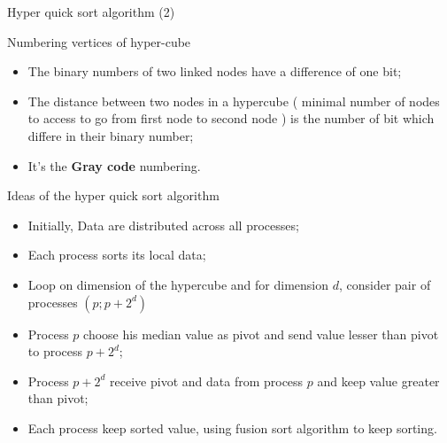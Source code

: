 \documentclass[compress,10pt,aspectratio=169]{beamer}
\begin{document}
\begin{frame}[fragile]{Hyper quick sort algorithm (2)}
\scriptsize

\begin{block}{\small Numbering vertices of hyper-cube}
\begin{itemize}
    \item The binary numbers of two linked nodes have a difference of one bit;
    \item The distance between two nodes in a hypercube ( minimal number of nodes to access to go from
          first node to second node ) is the number of bit which differe in their binary number;
    \item It's the \textbf{Gray code} numbering.
\end{itemize}        
\end{block}

\begin{exampleblock}{\small Ideas of the hyper quick sort algorithm}
    \begin{itemize}
        \item Initially, Data are distributed across all processes;
        \item Each process sorts its local data;
        \item Loop on dimension of the hypercube and for dimension $d$, consider pair of processes $\left(p;p+2^{d}\right)$
        \item Process $p$ choose his median value as pivot and send value lesser than pivot to process $p+2^{d}$;
        \item Process $p+2^{d}$ receive pivot and data from process $p$ and keep value greater than pivot;
        \item Each process keep sorted value, using fusion sort algorithm to keep sorting.
    \end{itemize}
\end{exampleblock}
\end{frame}
\end{document}
